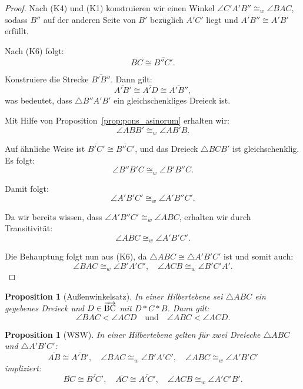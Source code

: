 \documentclass[a4paper,12pt]{article}
\theoremstyle{break}
\newtheorem{proposition}[definition]{Proposition}
\begin{document}
\begin{proof}
Nach (K4) und (K1) konstruieren wir einen Winkel \(\angle C'A'B'' \cong_w \angle BAC\), sodass \(B''\) auf der anderen Seite von \(B'\) bezüglich \(\overline{A'C'}\) liegt und \(\overline{A'B''} \cong \overline{A'B'}\) erfüllt.

Nach (K6) folgt:
\[
\overline{BC} \cong \overline{B''C'}.
\]

Konstruiere die Strecke \(\overline{B'B''}\). Dann gilt:
\[
\overline{A'B'} \cong \overline{A'D} \cong \overline{A'B''},
\]
was bedeutet, dass \(\triangle B''A'B'\) ein gleichschenkliges Dreieck ist. 

Mit Hilfe von Proposition~\ref{prop:pons_asinorum} erhalten wir:
\[
\angle ABB' \cong_w \angle AB'B.
\]

Auf ähnliche Weise ist \(\overline{B'C'} \cong \overline{B''C'}\), und das Dreieck \(\triangle BCB'\) ist gleichschenklig. Es folgt:
\[
\angle B''B'C \cong_w \angle B'B''C.
\]

Damit folgt:
\[
\angle A'B'C' \cong_w \angle A'B''C'.
\]

Da wir bereits wissen, dass \(\angle A'B''C' \cong_w \angle ABC\), erhalten wir durch Transitivität:
\[
\angle ABC \cong_w \angle A'B'C'.
\]

Die Behauptung folgt nun aus (K6), da \(\triangle ABC \cong \triangle A'B'C'\) ist und somit auch:
\[
\angle BAC \cong_w \angle B'A'C', \quad \angle ACB \cong_w \angle B'C'A'.
\]
\end{proof}

\begin{proposition}[Außenwinkelsatz]
In einer Hilbertebene sei \(\triangle ABC\) ein gegebenes Dreieck und \(D \in \overrightarrow{\rm BC}\) mit \(D * C * B\). Dann gilt:
\[
\angle BAC < \angle ACD \quad \text{und} \quad \angle ABC < \angle ACD.
\]
\end{proposition}

\begin{proposition}[WSW]
In einer Hilbertebene gelten für zwei Dreiecke \(\triangle ABC\) und \(\triangle A'B'C'\):
\[
\overline{AB} \cong \overline{A'B'}, \quad \angle BAC \cong_w \angle B'A'C', \quad \angle ABC \cong_w \angle A'B'C'
\]
impliziert:
\[
\overline{BC} \cong \overline{B'C'}, \quad \overline{AC} \cong \overline{A'C'}, \quad \angle ACB \cong_w \angle A'C'B'.
\]
\end{proposition}
\end{document}
